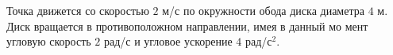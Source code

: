 Точка движется со скоростью $2$ м/с по окружности обода диска диаметра
$4$ м. Диск вращается в противоположном направлении, имея в данный мо
мент угловую скорость $2$ рад/с и угловое ускорение $4$ рад/с$^2$.
